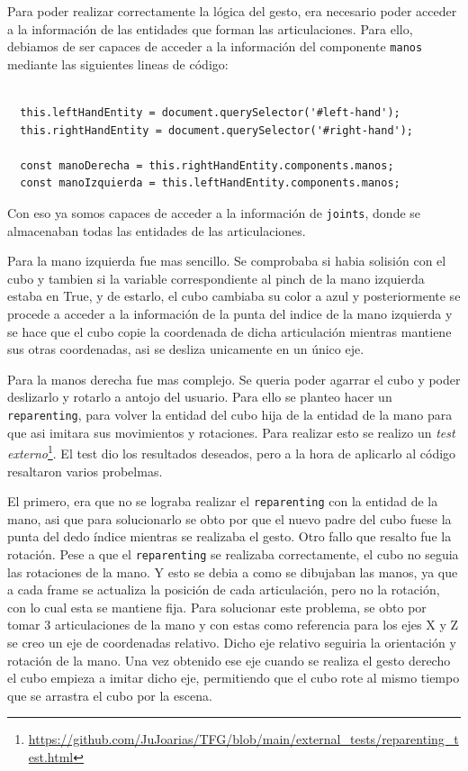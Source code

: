 \documentclass[a4paper, 12pt]{book}
\begin{document}
Para poder realizar correctamente la lógica del gesto, era necesario poder acceder a la información de las entidades que forman las articulaciones. Para ello, debiamos de ser capaces de acceder a la información del componente \texttt{manos} mediante las siguientes lineas de código:

\begin{lstlisting}[caption=Acceso información componente manos, captionpos=b, label=lst:info_manos]
  
  this.leftHandEntity = document.querySelector('#left-hand');
  this.rightHandEntity = document.querySelector('#right-hand');

  const manoDerecha = this.rightHandEntity.components.manos;
  const manoIzquierda = this.leftHandEntity.components.manos;
\end{lstlisting}

Con eso ya somos capaces de acceder a la información de \texttt{joints}, donde se almacenaban todas las entidades de las articulaciones.

Para la mano izquierda fue mas sencillo. Se comprobaba si habia solisión con el cubo y tambien si la variable correspondiente al pinch de la mano izquierda estaba en True, y de estarlo, el cubo cambiaba su color a azul y posteriormente se procede a acceder a la información 
de la punta del indice de la mano izquierda y se hace que el cubo copie la coordenada de dicha articulación mientras mantiene sus otras coordenadas, asi se desliza unicamente en un único eje.

Para la manos derecha fue mas complejo. Se queria poder agarrar el cubo y poder deslizarlo y rotarlo a antojo del usuario. Para ello se planteo hacer un \texttt{reparenting}, para volver la entidad del cubo hija de la entidad de la mano para que asi imitara sus movimientos y rotaciones. Para realizar esto se realizo un \textit{test externo}\footnote{\url{https://github.com/JuJoarias/TFG/blob/main/external_tests/reparenting_test.html}}.
El test dio los resultados deseados, pero a la hora de aplicarlo al código resaltaron varios probelmas. 

El primero, era que no se lograba realizar el \texttt{reparenting} con la entidad de la mano, asi que para solucionarlo se obto por que el nuevo padre del cubo fuese la punta del dedo índice mientras se realizaba el gesto.
Otro fallo que resalto fue la rotación. Pese a que el \texttt{reparenting} se realizaba correctamente, el cubo no seguia las rotaciones de la mano. Y esto se debia a como se dibujaban las manos, ya que a cada frame se actualiza la posición de cada articulación, pero no la rotación, con lo cual esta se mantiene fija. Para solucionar este problema, se obto por tomar 3 articulaciones de la mano y con estas 
como referencia para los ejes X y Z se creo un eje de coordenadas relativo. Dicho eje relativo seguiria la orientación y rotación de la mano. Una vez obtenido ese eje cuando se realiza el gesto derecho el cubo empieza a imitar dicho eje, permitiendo que el cubo rote al mismo tiempo que se arrastra el cubo por la escena. 
\end{document}
